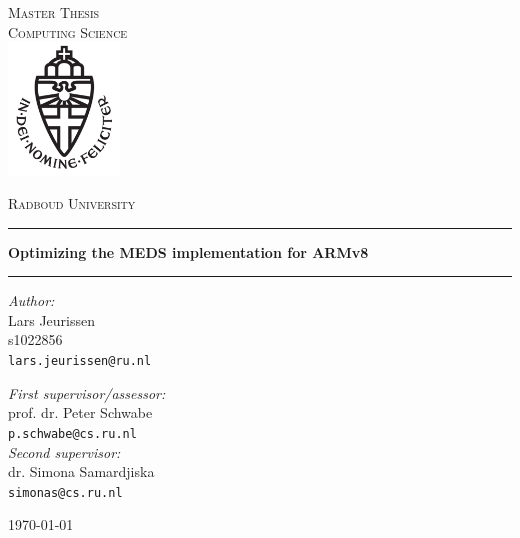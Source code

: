 \documentclass[11pt,a4paper]{report}
\theoremstyle{definition}
\begin{document}
\begin{titlepage}
  \begin{center}
    \textsc{\LARGE Master Thesis\\Computing Science}\\[1.5cm]
    \includegraphics[height=100pt]{logo}

    \vspace{0.4cm}
    \textsc{\Large Radboud University}\\[1cm]
    \hrule
    \vspace{0.4cm}
    \textbf{\huge Optimizing the MEDS implementation for ARMv8}\\[0.4cm]
    \vspace{0.2cm}
    \hrule
    \vspace{2cm}
    \begin{minipage}[t]{0.45\textwidth}
      \begin{flushleft} \large
        \textit{Author:}\\
        Lars Jeurissen\\
        s1022856\\
        \texttt{lars.jeurissen@ru.nl}
      \end{flushleft}
    \end{minipage}
    \begin{minipage}[t]{0.45\textwidth}
      \begin{flushright} \large
        \textit{First supervisor/assessor:}\\
        prof. dr. Peter Schwabe\\
        \texttt{p.schwabe@cs.ru.nl}\\[1.3cm]
        \textit{Second supervisor:}\\
        dr. Simona Samardjiska\\
        \texttt{simonas@cs.ru.nl}
      \end{flushright}
    \end{minipage}
    \vfill
    {\large \today}
  \end{center}
\end{titlepage}


\end{document}
